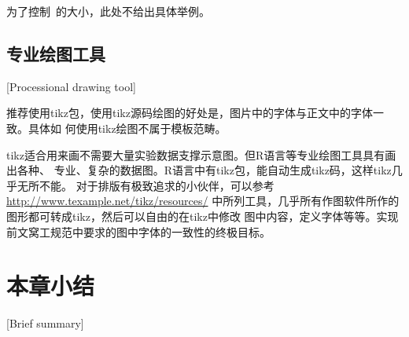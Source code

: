 为了控制\hitszthesis\ 的大小，此处不给出具体举例。

\subsection{专业绘图工具}[Processional drawing tool]
\label{drawtool}

推荐使用tikz包，使用tikz源码绘图的好处是，图片中的字体与正文中的字体一致。具体如
何使用tikz绘图不属于模板范畴。

tikz适合用来画不需要大量实验数据支撑示意图。但R语言等专业绘图工具具有画出各种、
专业、复杂的数据图。R语言中有tikz包，能自动生成tikz码，这样tikz几乎无所不能。
对于排版有极致追求的小伙伴，可以参考
\href{http://www.texample.net/tikz/resources/}{http://www.texample.net/tikz/resources/}
中所列工具，几乎所有作图软件所作的图形都可转成tikz，然后可以自由的在tikz中修改
图中内容，定义字体等等。实现前文窝工规范中要求的图中字体的一致性的终极目标。

\lipsum[1]

\section{本章小结}[Brief summary]

\lipsum[1]
